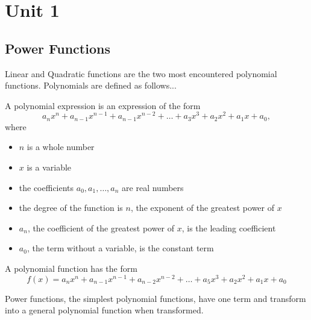 \documentclass{article}
\begin{document}
\newpage    
\section{Unit 1}
\subsection{Power Functions}

\begin{minipage}[t]{\textwidth}
Linear and Quadratic functions are the two most encountered polynomial functions. Polynomials are defined as follows...

A polynomial expression is an expression of the form
\[
a_n x^n + a_{n-1} x^{n-1} + a_{n-1} x^{n-2} + \ldots + a_3 x^3 + a_2 x^2 + a_1 x + a_0,
\]
where
\begin{itemize}
    \item \( n \) is a whole number
    \item \( x \) is a variable
    \item the coefficients \( a_0, a_1, \ldots, a_n \) are real numbers
    \item the degree of the function is \( n \), the exponent of the greatest power of \( x \)
    \item \( a_n \), the coefficient of the greatest power of \( x \), is the leading coefficient
    \item \( a_0 \), the term without a variable, is the constant term
\end{itemize}

A polynomial function has the form
\[
f(x) = a_n x^n + a_{n-1} x^{n-1} + a_{n-2} x^{n-2} + \ldots + a_5 x^3 + a_2 x^2 + a_1 x + a_0
\]

Power functions, the simplest polynomial functions, have one term and transform into a general polynomial function when transformed.
\end{minipage}

\vspace{0.5cm}
\end{document}
